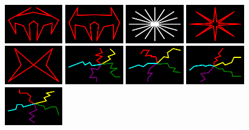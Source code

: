 \begin{figure}[H]
    \includegraphics[width=2.5cm]{preface/vector_images/vec_image_ener43.png}
    \includegraphics[width=2.5cm]{preface/vector_images/vec_image_ener44.png}
    \includegraphics[width=2.5cm]{preface/vector_images/vec_image_expl1.png}
    \includegraphics[width=2.5cm]{preface/vector_images/vec_image_explop.png}
    \includegraphics[width=2.5cm]{preface/vector_images/vec_image_flipper.png}
    \includegraphics[width=2.5cm]{preface/vector_images/vec_image_fuse0.png}
    \includegraphics[width=2.5cm]{preface/vector_images/vec_image_fuse1.png}
    \includegraphics[width=2.5cm]{preface/vector_images/vec_image_fuse2.png}
    \includegraphics[width=2.5cm]{preface/vector_images/vec_image_fuse3.png}

\end{figure}
